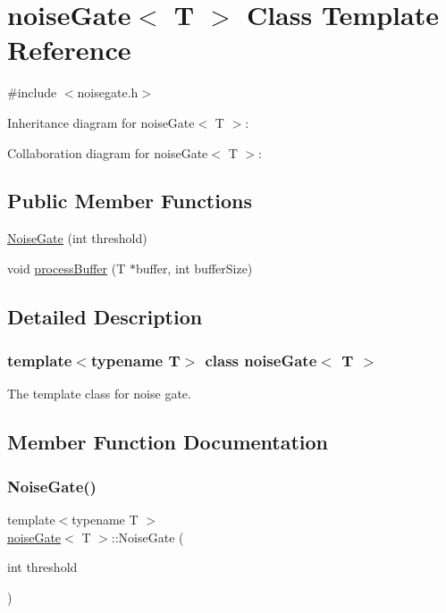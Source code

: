 \hypertarget{classnoiseGate}{}\section{noise\+Gate$<$ T $>$ Class Template Reference}
\label{classnoiseGate}


{\ttfamily \#include $<$noisegate.\+h$>$}



Inheritance diagram for noise\+Gate$<$ T $>$\+:


Collaboration diagram for noise\+Gate$<$ T $>$\+:
\subsection*{Public Member Functions}
\begin{DoxyCompactItemize}
\item 
\hyperlink{classnoiseGate_a2a8d6804f220f93c97a2ac4e0009b4f7}{Noise\+Gate} (int threshold)
\item 
void \hyperlink{classnoiseGate_a24c7bf2408489d8f97904de70641b4a2}{process\+Buffer} (T $\ast$buffer, int buffer\+Size)
\end{DoxyCompactItemize}


\subsection{Detailed Description}
\subsubsection*{template$<$typename T$>$\newline
class noise\+Gate$<$ T $>$}

The template class for noise gate. 

\subsection{Member Function Documentation}
\mbox{\label{classnoiseGate_a2a8d6804f220f93c97a2ac4e0009b4f7}} 
\subsubsection{\texorpdfstring{Noise\+Gate()}{NoiseGate()}}
{\footnotesize\ttfamily template$<$typename T $>$ \\
\hyperlink{classnoiseGate}{noise\+Gate}$<$ T $>$\+::Noise\+Gate (\begin{DoxyParamCaption}\item[{int}]{threshold }\end{DoxyParamCaption})}

